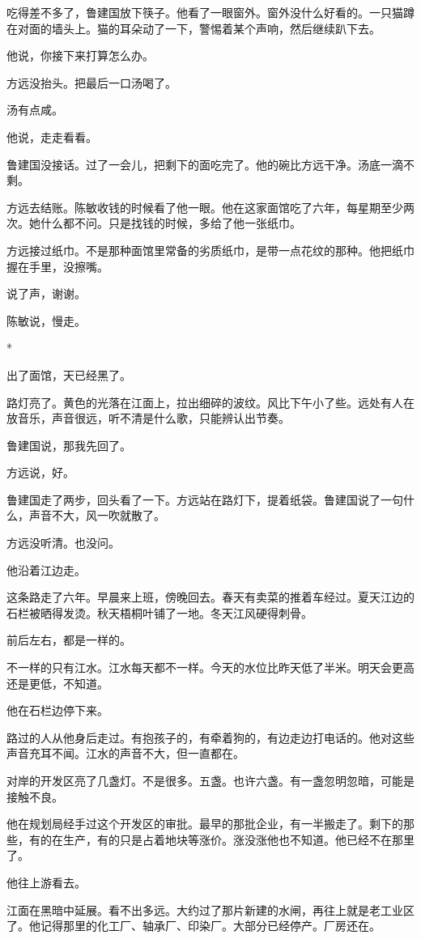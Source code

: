 \documentclass[UTF8,a5paper,11pt,openany]{ctexbook}
\newcommand{\scene}{\vspace{1em}\begin{center}*\quad*\quad*\end{center}\vspace{0.5em}}
\begin{document}
吃得差不多了，鲁建国放下筷子。他看了一眼窗外。窗外没什么好看的。一只猫蹲在对面的墙头上。猫的耳朵动了一下，警惕着某个声响，然后继续趴下去。

他说，你接下来打算怎么办。

方远没抬头。把最后一口汤喝了。

汤有点咸。

他说，走走看看。

鲁建国没接话。过了一会儿，把剩下的面吃完了。他的碗比方远干净。汤底一滴不剩。

方远去结账。陈敏收钱的时候看了他一眼。他在这家面馆吃了六年，每星期至少两次。她什么都不问。只是找钱的时候，多给了他一张纸巾。

方远接过纸巾。不是那种面馆里常备的劣质纸巾，是带一点花纹的那种。他把纸巾握在手里，没擦嘴。

说了声，谢谢。

陈敏说，慢走。


\scene

出了面馆，天已经黑了。

路灯亮了。黄色的光落在江面上，拉出细碎的波纹。风比下午小了些。远处有人在放音乐，声音很远，听不清是什么歌，只能辨认出节奏。

鲁建国说，那我先回了。

方远说，好。

鲁建国走了两步，回头看了一下。方远站在路灯下，提着纸袋。鲁建国说了一句什么，声音不大，风一吹就散了。

方远没听清。也没问。

他沿着江边走。

这条路走了六年。早晨来上班，傍晚回去。春天有卖菜的推着车经过。夏天江边的石栏被晒得发烫。秋天梧桐叶铺了一地。冬天江风硬得刺骨。

前后左右，都是一样的。

不一样的只有江水。江水每天都不一样。今天的水位比昨天低了半米。明天会更高还是更低，不知道。

他在石栏边停下来。

路过的人从他身后走过。有抱孩子的，有牵着狗的，有边走边打电话的。他对这些声音充耳不闻。江水的声音不大，但一直都在。

对岸的开发区亮了几盏灯。不是很多。五盏。也许六盏。有一盏忽明忽暗，可能是接触不良。

他在规划局经手过这个开发区的审批。最早的那批企业，有一半搬走了。剩下的那些，有的在生产，有的只是占着地块等涨价。涨没涨他也不知道。他已经不在那里了。

他往上游看去。

江面在黑暗中延展。看不出多远。大约过了那片新建的水闸，再往上就是老工业区了。他记得那里的化工厂、轴承厂、印染厂。大部分已经停产。厂房还在。
\end{document}
